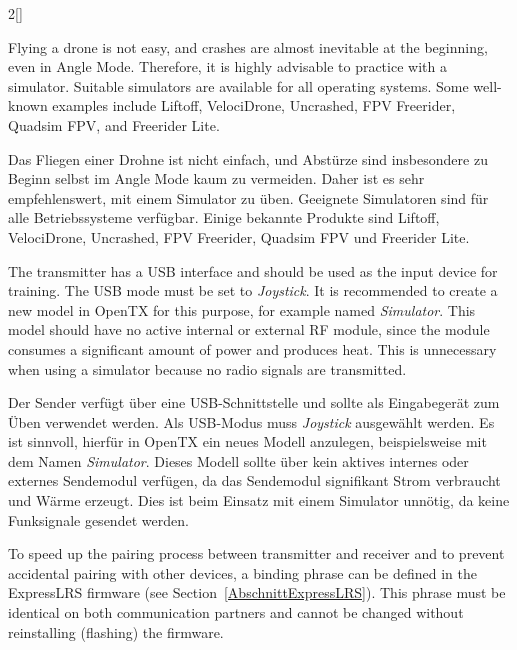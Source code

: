 \begin{paracol}{2}[]
\renewcommand{\deutschertitel}{Mit einem Simulator üben}
\renewcommand{\englischertitel}{Practice with a Simulator}
\makroabschnitt
\label{AbschnittSimulator}

Flying a drone is not easy, and crashes are almost inevitable at the beginning, even in Angle Mode. Therefore, it is highly advisable to practice with a simulator. Suitable simulators are available for all operating systems. Some well-known examples include Liftoff, VelociDrone, Uncrashed, FPV Freerider, Quadsim FPV, and Freerider Lite. 

\colger

Das Fliegen einer Drohne ist nicht einfach, und Abstürze sind insbesondere zu Beginn selbst im Angle Mode kaum zu vermeiden. Daher ist es sehr empfehlenswert, mit einem Simulator zu üben. Geeignete Simulatoren sind für alle Betriebssysteme verfügbar. Einige bekannte Produkte sind Liftoff, VelociDrone, Uncrashed, FPV Freerider, Quadsim FPV und Freerider Lite. 

\coleng

The transmitter has a USB interface and should be used as the input device for training. The USB mode must be set to \textsl{Joystick}. It is recommended to create a new model in OpenTX for this purpose, for example named \textsl{Simulator}. This model should have no active internal or external RF module, since the module consumes a significant amount of power and produces heat. This is unnecessary when using a simulator because no radio signals are transmitted.

\colger

Der Sender verfügt über eine USB-Schnittstelle und sollte als Eingabegerät zum Üben verwendet werden. Als USB-Modus muss \textsl{Joystick} ausgewählt werden. Es ist sinnvoll, hierfür in OpenTX ein neues Modell anzulegen, beispielsweise mit dem Namen \textsl{Simulator}. Dieses Modell sollte über kein aktives internes oder externes Sendemodul verfügen, da das Sendemodul signifikant Strom verbraucht und Wärme erzeugt. Dies ist beim Einsatz mit einem Simulator unnötig, da keine Funksignale gesendet werden.

\colende

\renewcommand{\deutschertitel}{Die Kopplung automatisieren}
\renewcommand{\englischertitel}{Automate the Pairing}
\makroabschnitt
\label{AbschnittBindingPhrase1}

To speed up the pairing process between transmitter and receiver and to prevent accidental pairing with other devices, a binding phrase can be defined in the ExpressLRS firmware (see Section~\ref{AbschnittExpressLRS}). This phrase must be identical on both communication partners and cannot be changed without reinstalling (flashing) the firmware.


\end{paracol}
